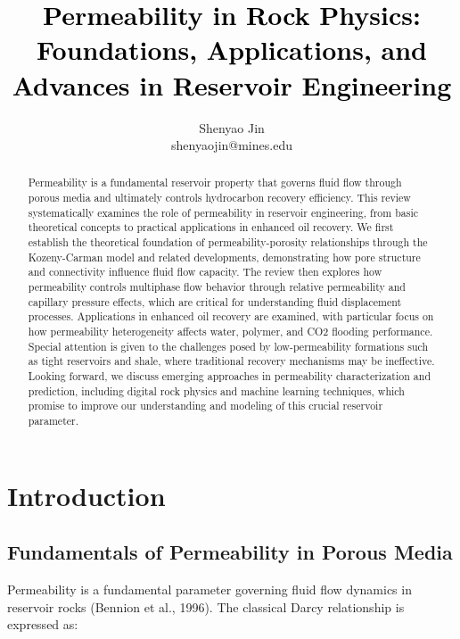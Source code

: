\documentclass[journal]{IEEEtran}
\begin{document}
\title{\textcolor{black}{Permeability in Rock Physics: Foundations, Applications, and Advances in Reservoir Engineering}}      

\author{Shenyao Jin\\shenyaojin@mines.edu} 

\maketitle

\begin{abstract}
    Permeability is a fundamental reservoir property that governs fluid flow through porous media and ultimately controls hydrocarbon recovery efficiency. This review systematically examines the role of permeability in reservoir engineering, from basic theoretical concepts to practical applications in enhanced oil recovery. We first establish the theoretical foundation of permeability-porosity relationships through the Kozeny-Carman model and related developments, demonstrating how pore structure and connectivity influence fluid flow capacity. The review then explores how permeability controls multiphase flow behavior through relative permeability and capillary pressure effects, which are critical for understanding fluid displacement processes. Applications in enhanced oil recovery are examined, with particular focus on how permeability heterogeneity affects water, polymer, and CO2 flooding performance. Special attention is given to the challenges posed by low-permeability formations such as tight reservoirs and shale, where traditional recovery mechanisms may be ineffective. Looking forward, we discuss emerging approaches in permeability characterization and prediction, including digital rock physics and machine learning techniques, which promise to improve our understanding and modeling of this crucial reservoir parameter.
\end{abstract}

\section{Introduction}

\subsection{Fundamentals of Permeability in Porous Media}

Permeability is a fundamental parameter governing fluid flow dynamics in reservoir rocks (Bennion et al., 1996). The classical Darcy relationship is expressed as:
\end{document}

